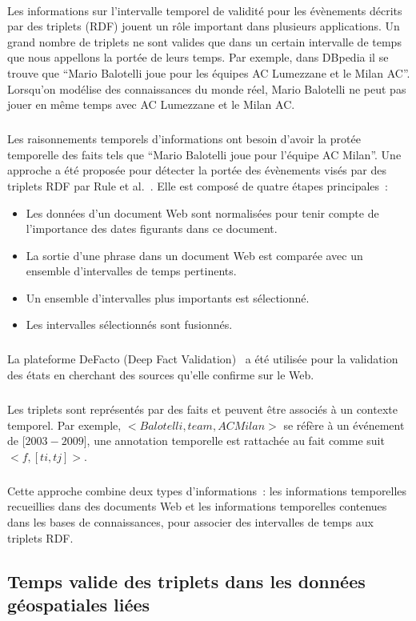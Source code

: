 \paragraph{}
Les informations sur l'intervalle temporel de validité pour les évènements décrits par des triplets (RDF) jouent un rôle important dans plusieurs applications.
Un grand nombre de triplets ne sont valides que dans un certain intervalle de temps que nous appellons la portée de leurs temps.
Par exemple, dans DBpedia il se trouve que ``Mario Balotelli joue pour les équipes AC Lumezzane et le Milan AC''. Lorsqu'on modélise des connaissances du monde réel, Mario Balotelli ne peut pas jouer en même temps avec AC Lumezzane et le Milan AC.
\subparagraph{}
Les raisonnements temporels d'informations ont besoin d'avoir la protée temporelle des faits tels que ``Mario Balotelli joue pour l'équipe AC Milan''.
Une approche a été proposée pour détecter la portée des évènements visés par des triplets RDF par Rule et al.~\cite{rula2014}. Elle est composé de quatre étapes principales~:
\begin{itemize}
\item Les données d'un document Web sont normalisées pour tenir compte de l’importance des dates figurants dans ce document.
\item La sortie d'une phrase dans un document Web est comparée avec un ensemble d’intervalles de temps pertinents.
\item Un ensemble d’intervalles plus importants est sélectionné.
\item Les intervalles sélectionnés sont fusionnés.
\end{itemize}
\subparagraph{}
La plateforme DeFacto (Deep Fact Validation)~\cite{lehmann2012} a été utilisée pour la validation des états en cherchant des sources qu'elle confirme sur le Web.
\subparagraph{}
Les triplets sont représentés par des faits et peuvent être associés à un contexte temporel.
Par exemple, $<Balotelli, team, AC Milan>$ se réfère à un événement de [$2003-2009$], une annotation temporelle est rattachée au fait comme suit $<f, [ti,tj]>$.
\subparagraph{}
Cette approche combine deux types d'informations~: les informations temporelles recueillies dans des documents Web et les informations temporelles contenues dans les bases de connaissances, pour associer des intervalles de temps aux triplets RDF.
\subsection{Temps valide des triplets dans les données géospatiales liées}
